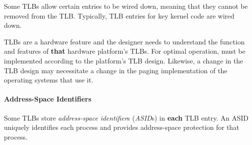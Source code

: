 Some TLBs allow certain entries to be wired down, meaning that they cannot be removed from the TLB.\@
Typically, TLB entries for key kernel code are wired down.

TLBs are a hardware feature and the  designer needs to understand the function and features of \textbf{that} hardware platform's TLBs.
For optimal operation,  must be implemented according to the platform’s TLB design.
Likewise, a change in the TLB design may necessitate a change in the paging implementation of the operating systems that use it.

\paragraph{Address-Space Identifiers}\label{par:Address_Space_Identifiers}
Some TLBs store \emph{address-space identifier}s (\emph{ASID}s) in \textbf{each} TLB entry.
An ASID uniquely identifies each process and provides address-space protection for that process.
